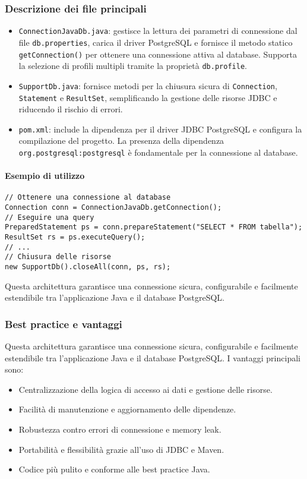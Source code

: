 \subsubsection{Descrizione dei file principali}
\begin{itemize}
    \item \texttt{ConnectionJavaDb.java}: gestisce la lettura dei parametri di connessione dal file \texttt{db.properties}, carica il driver PostgreSQL e fornisce il metodo statico \texttt{getConnection()} per ottenere una connessione attiva al database. Supporta la selezione di profili multipli tramite la proprietà \texttt{db.profile}.
    \item \texttt{SupportDb.java}: fornisce metodi per la chiusura sicura di \texttt{Connection}, \texttt{Statement} e \texttt{ResultSet}, semplificando la gestione delle risorse JDBC e riducendo il rischio di errori.
    \item \texttt{pom.xml}: include la dipendenza per il driver JDBC PostgreSQL e configura la compilazione del progetto. La presenza della dipendenza \texttt{org.postgresql:postgresql} è fondamentale per la connessione al database.
\end{itemize}

\paragraph{Esempio di utilizzo}
\begin{verbatim}
// Ottenere una connessione al database
Connection conn = ConnectionJavaDb.getConnection();
// Eseguire una query
PreparedStatement ps = conn.prepareStatement("SELECT * FROM tabella");
ResultSet rs = ps.executeQuery();
// ...
// Chiusura delle risorse
new SupportDb().closeAll(conn, ps, rs);
\end{verbatim}

Questa architettura garantisce una connessione sicura, configurabile e facilmente estendibile tra l'applicazione Java e il database PostgreSQL.
\subsubsection{Best practice e vantaggi}
Questa architettura garantisce una connessione sicura, configurabile e facilmente estendibile tra l'applicazione Java e il database PostgreSQL. I vantaggi principali sono:
\begin{itemize}
    \item Centralizzazione della logica di accesso ai dati e gestione delle risorse.
    \item Facilità di manutenzione e aggiornamento delle dipendenze.
    \item Robustezza contro errori di connessione e memory leak.
    \item Portabilità e flessibilità grazie all'uso di JDBC e Maven.
    \item Codice più pulito e conforme alle best practice Java.
\end{itemize}
